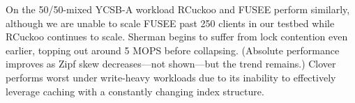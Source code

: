 On the 50/50-mixed YCSB-A workload RCuckoo and FUSEE perform
similarly, although we are unable to scale FUSEE past 250 clients in
our testbed while RCuckoo continues to scale.
Sherman begins to suffer from lock contention even earlier, topping
out around 5 MOPS before collapsing.  (Absolute performance improves as Zipf skew decreases---not shown---but the
trend remains.)
Clover performs worst under
write-heavy workloads due to its inability to effectively leverage
caching with a constantly changing index structure.




